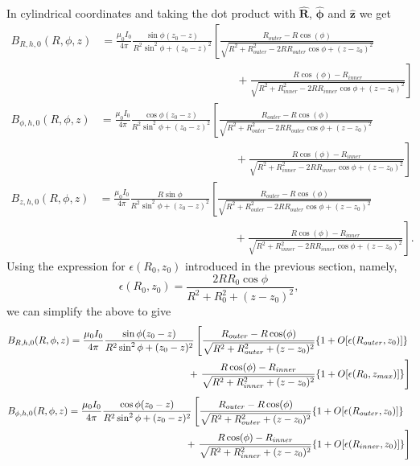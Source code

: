 \documentclass{article}
\let\vec\mathbf
\begin{document}
In cylindrical coordinates and taking the dot product with $\vec{\hat{R}}$, $\vec{\hat{\phi}}$ and $\vec{\hat{z}}$ we get
\[\begin{aligned}
    B_{R,h,0}(R, \phi, z) &= \frac{\mu_0 I_0}{4\pi}\frac{\sin\phi(z_0-z)}{R^2\sin^2\phi+(z_0-z)^2}\left[\frac{R_{outer}-R\cos(\phi)}{\sqrt{R^2+R_{outer}^2-2RR_{outer}\cos\phi+(z-z_0)^2}}\right. \\
    &\qquad\qquad\qquad\qquad\qquad\qquad+\left.\frac{R\cos(\phi)-R_{inner}}{\sqrt{R^2+R_{inner}^2-2RR_{inner}\cos\phi+(z-z_0)^2}}\right]
\end{aligned}\]
\[\begin{aligned}
    B_{\phi,h,0}(R, \phi, z) &= \frac{\mu_0 I_0}{4\pi}\frac{\cos\phi(z_0-z)}{R^2\sin^2\phi+(z_0-z)^2}\left[\frac{R_{outer}-R\cos(\phi)}{\sqrt{R^2+R_{outer}^2-2RR_{outer}\cos\phi+(z-z_0)^2}}\right. \\
    &\qquad\qquad\qquad\qquad\qquad\qquad+\left.\frac{R\cos(\phi)-R_{inner}}{\sqrt{R^2+R_{inner}^2-2RR_{inner}\cos\phi+(z-z_0)^2}}\right]
\end{aligned}\]
\[\begin{aligned}
    B_{z,h,0}(R, \phi, z) &= \frac{\mu_0 I_0}{4\pi}\frac{R\sin\phi}{R^2\sin^2\phi+(z_0-z)^2}\left[\frac{R_{outer}-R\cos(\phi)}{\sqrt{R^2+R_{outer}^2-2RR_{outer}\cos\phi+(z-z_0)^2}}\right. \\
    &\qquad\qquad\qquad\qquad\qquad\qquad+\left.\frac{R\cos(\phi)-R_{inner}}{\sqrt{R^2+R_{inner}^2-2RR_{inner}\cos\phi+(z-z_0)^2}}\right].
\end{aligned}\]
Using the expression for $\epsilon(R_0, z_0)$ introduced in the previous section, namely,
\[\epsilon(R_0, z_0) = \frac{2RR_0\cos\phi}{R^2+R_0^2+(z-z_0)^2},\]
we can simplify the above to give
\[\begin{aligned}
    B_{R,h,0}(R, \phi, z) &= \frac{\mu_0 I_0}{4\pi}\frac{\sin\phi(z_0-z)}{R^2\sin^2\phi+(z_0-z)^2}\left[\frac{R_{outer}-R\cos(\phi)}{\sqrt{R^2+R_{outer}^2+(z-z_0)^2}}\qty{1+O[\epsilon(R_{outer}, z_0)]}\right. \\
    &\qquad\qquad\qquad\qquad\qquad\qquad+\left.\frac{R\cos(\phi)-R_{inner}}{\sqrt{R^2+R_{inner}^2+(z-z_0)^2}}\qty{1+O[\epsilon(R_0, z_{max})]}\right]
\end{aligned}\]
\[\begin{aligned}
    B_{\phi,h,0}(R, \phi, z) &= \frac{\mu_0 I_0}{4\pi}\frac{\cos\phi(z_0-z)}{R^2\sin^2\phi+(z_0-z)^2}\left[\frac{R_{outer}-R\cos(\phi)}{\sqrt{R^2+R_{outer}^2+(z-z_0)^2}}\qty{1+O[\epsilon(R_{outer}, z_0)]}\right. \\
    &\qquad\qquad\qquad\qquad\qquad\qquad+\left.\frac{R\cos(\phi)-R_{inner}}{\sqrt{R^2+R_{inner}^2+(z-z_0)^2}}\qty{1+O[\epsilon(R_{inner}, z_0)]}\right]
\end{aligned}\]
\end{document}
